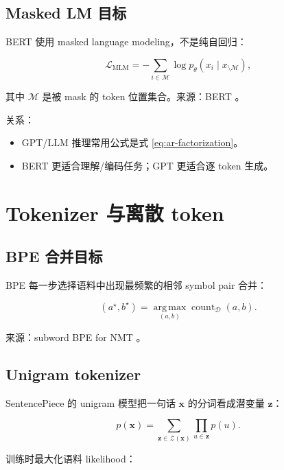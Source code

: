 \documentclass[UTF8,12pt]{ctexart}
\newcommand{\1}{\mathbf{1}}
\newcommand{\argmax}{\operatorname*{arg\,max}}
\begin{document}
\subsection{Masked LM 目标}

BERT 使用 masked language modeling，不是纯自回归：

\begin{equation}
\mathcal{L}_{\mathrm{MLM}}
=-\sum_{i\in\mathcal{M}}
\log p_\theta(x_i\mid x_{\setminus \mathcal{M}}),
\label{eq:mlm}
\end{equation}

其中 $\mathcal{M}$ 是被 mask 的 token 位置集合。来源：BERT \cite{devlin2018bert}。

关系：

\begin{itemize}
  \item GPT/LLM 推理常用公式是式 \eqref{eq:ar-factorization}。
  \item BERT 更适合理解/编码任务；GPT 更适合逐 token 生成。
\end{itemize}

\section{Tokenizer 与离散 token}

\subsection{BPE 合并目标}

BPE 每一步选择语料中出现最频繁的相邻 symbol pair 合并：

\begin{equation}
(a^\star,b^\star)
=\argmax_{(a,b)}
\operatorname{count}_{\mathcal{D}}(a,b).
\end{equation}

来源：subword BPE for NMT \cite{sennrich2015bpe}。

\subsection{Unigram tokenizer}

SentencePiece 的 unigram 模型把一句话 $\bm{x}$ 的分词看成潜变量 $\bm{z}$：

\begin{equation}
p(\bm{x})
=\sum_{\bm{z}\in \mathcal{Z}(\bm{x})}
\prod_{u\in \bm{z}}p(u).
\end{equation}

训练时最大化语料 likelihood：
\end{document}
